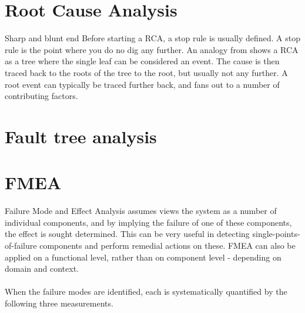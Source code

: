 \cite{hollnagel2005joint}%

\section{Root Cause Analysis}
Sharp and blunt end
Before starting a RCA, a stop rule is usually defined. A stop rule is the point where you do no dig any further. An analogy from \cite{hollnagel2004barriers} shows a RCA as a tree where the single leaf can be considered an event. The cause is then traced back to the roots of the tree to the root, but usually not any further. A root event can typically be traced further back, and fans out to a number of contributing factors.


\section{Fault tree analysis}
\label{sec:fault_tree_analysis}

\section{FMEA}
Failure Mode and Effect Analysis assumes views the system as a number of individual components, and by implying the failure of one of these components, the effect is sought determined. This can be very useful in detecting single-points-of-failure components and perform remedial actions on these. FMEA can also be applied on a functional level, rather than on component level - depending on domain and context.\\
\\
When the failure modes are identified, each is systematically quantified by the following three measurements.

